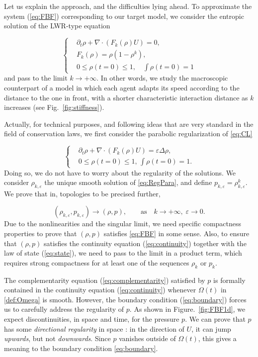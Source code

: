 \documentclass[11pt,twoside]{article}
\numberwithin{equation}{section}
\newcommand {\eps}  {\varepsilon}
\begin{document}
Let us explain the approach, and the difficulties lying ahead. To approximate the system (\ref{eq:FBF}) corresponding to our target model, we consider the entropic solution of the LWR-type equation

\begin{equation}
\label{eq:CL}
\left\{\begin{aligned}
 &\partial_t \rho + \nabla \cdot (F_k(\rho)U) = 0, \\
 &F_k(\rho) = \rho(1-\rho^k),\\
 &0 \le \rho(t=0) \le 1, \quad \int\rho(t=0) = 1
\end{aligned}\right.
\end{equation}
and pass to the limit \(k \to +\infty\). In other words, we study the macroscopic counterpart of a model in which each agent adapts its speed according to the distance to the one in front, with a shorter characteristic interaction distance as \(k\) increases (see Fig.~\ref{fig:stiffness}).

Actually, for technical purposes, and following ideas that are very standard in the field of conservation laws, we first consider the parabolic regularization of \eqref{eq:CL} 

\begin{equation}
\label{eq:RegPara}
\left\{\begin{aligned}
&\partial_t \rho + \nabla \cdot (F_k(\rho)U) = \eps \Delta \rho, \\
&0 \leq \rho(t=0) \leq 1, \, \int \rho(t=0)  =1.
\end{aligned}\right.
\end{equation}
Doing so, we do not have to worry about the regularity of the solutions. We consider $\rho_{k,\eps}$ the unique smooth solution of \eqref{eq:RegPara}, and define $p_{k,\eps} = \rho_{k,\eps}^k$. We prove that in, topologies to be precised further,

\[
(\rho_{k,\eps},p_{k,\eps}) {\longrightarrow} (\rho,p),  \qquad \text{as} \quad k \to + \infty, \; \eps  \to 0.
\]
Due to the nonlinearities and the singular limit,  we need  specific compactness properties to prove that $(\rho,p)$ satisfies \eqref{eq:FBF} in some sense. Also, to ensure that \((\rho,p)\) satisfies the continuity equation (\ref{eq:continuity}) together with the law of state (\ref{eq:state}), we need to pass to the limit in a product term, which requires strong compactness for at least one of the sequences \(\rho_k\) or \(p_k\).

The complementarity equation (\ref{eq:complementarity}) satisfied by \(p\) is formally contained in the continuity equation (\ref{eq:continuity}) whenever \(\Omega(t)\) in \eqref {def:Omega} is smooth. However, the boundary condition (\ref{eq:boundary}) forces us to carefully address the regularity of \(p\). As shown in Figure.~\ref{fig:FBF1d}, we  expect discontinuities, in space and time, for the pressure $p$. 
We can prove that $p$ has some \textit{directional regularity} in space : in the direction of $U$, it can jump \textit{upwards}, but not \textit{downwards}. Since $p$ vanishes outside of $\Omega(t)$, this gives a meaning to the boundary condition \eqref{eq:boundary}.
\end{document}
